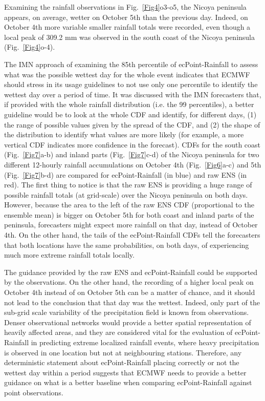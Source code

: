 \documentclass[twocol]{ametsocV5} %
\begin{document}
Examining the rainfall observations in Fig.~\ref{Fig4}o3-o5, the Nicoya peninsula appears, on average, wetter on October 5th than the previous day. Indeed, on October 4th more variable smaller rainfall totals were recorded, even though a local peak of 309.2 mm was observed in the south coast of the Nicoya peninsula (Fig.~\ref{Fig4}o-4). \par
The IMN approach of examining the 85th percentile of ecPoint-Rainfall to assess what was the possible wettest day for the whole event indicates that ECMWF should stress in its usage guidelines to not use only one percentile to identify the wettest day over a period of time. It was discussed with the IMN forecasters that, if provided with the whole rainfall distribution (i.e. the 99 percentiles), a better guideline would be to look at the whole CDF and identify, for different days, (1) the range of possible values given by the spread of the CDF, and (2) the shape of the distribution to identify what values are more likely (for example, a more vertical CDF indicates more confidence in the forecast). CDFs for the south coast (Fig.~\ref{Fig7}a-b) and inland parts (Fig.~\ref{Fig7}c-d) of the Nicoya peninsula for two different 12-hourly rainfall accumulations on October 4th (Fig.~\ref{Fig6}a-c) and 5th (Fig.~\ref{Fig7}b-d) are compared for ecPoint-Rainfall (in blue) and raw ENS (in red). The first thing to notice is that the raw ENS is providing a huge range of possible rainfall totals (at grid-scale) over the Nicoya peninsula on both days. However, because the area to the left of the raw ENS CDF (proportional to the ensemble mean) is bigger on October 5th for both coast and inland parts of the peninsula, forecasters might expect more rainfall on that day, instead of October 4th. On the other hand, the tails of the ecPoint-Rainfall CDFs tell the forecasters that both locations have the same probabilities, on both days, of experiencing much more extreme rainfall totals locally. \par
The guidance provided by the raw ENS and ecPoint-Rainfall could be supported by the observations. On the other hand, the recording of a higher local peak on October 4th instead of on October 5th can be a matter of chance, and it should not lead to the conclusion that that day was the wettest. Indeed, only part of the sub-grid scale variability of the precipitation field is known from observations. Denser observational networks would provide a better spatial representation of heavily affected areas, and they are considered vital for the evaluation of ecPoint-Rainfall in predicting extreme localized rainfall events, where heavy precipitation is observed in one location but not at neighbouring stations. Therefore, any deterministic statement about ecPoint-Rainfall placing correctly or not the wettest day within a period suggests that ECMWF needs to provide a better guidance on what is a better baseline when comparing ecPoint-Rainfall against point observations.
\end{document}
